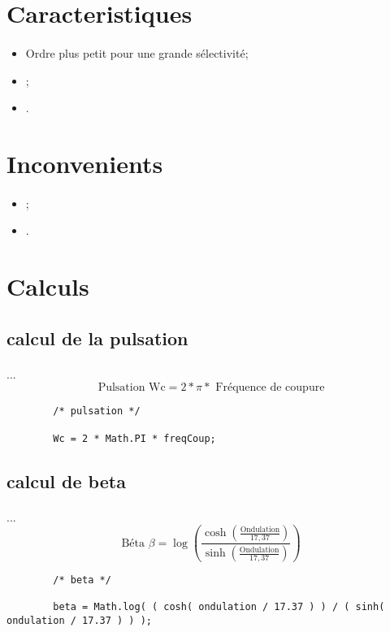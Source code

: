 \documentclass[a4paper,11pt]{article}
\begin{document}
    \clearpage

\section{Caracteristiques}
    \paragraph{}
    \begin{itemize}
        \item Ordre plus petit pour une grande sélectivité;
        \item ;
        \item .
    \end{itemize}

\section{Inconvenients}
    \paragraph{}
    \begin{itemize}
        \item ;
        \item .
    \end{itemize}

    \clearpage

\section{Calculs}
\subsection{calcul de la pulsation}
    \paragraph{}
    ...\[ \mbox{Pulsation Wc} = 2 * \pi * \mbox{ Fréquence de coupure}\]
    \begin{lstlisting}
        /* pulsation */

        Wc = 2 * Math.PI * freqCoup;

    \end{lstlisting}

\subsection{calcul de beta}
    \paragraph{}
    ...\[ \mbox{Béta } \beta = \log( \frac{ \cosh( \frac{ \mbox{Ondulation} }{17,37} ) } { \sinh( \frac{ \mbox{Ondulation} }{17,37} ) } )\]
    \begin{lstlisting}
        /* beta */

        beta = Math.log( ( cosh( ondulation / 17.37 ) ) / ( sinh( ondulation / 17.37 ) ) );

    \end{lstlisting}
\end{document}
